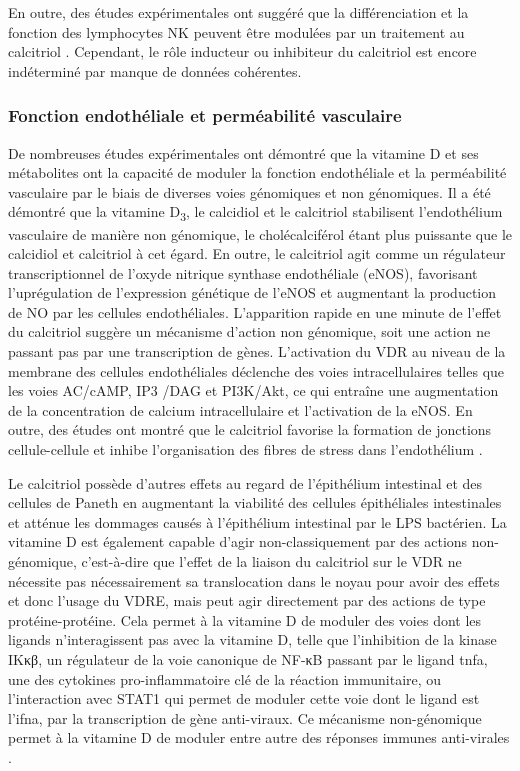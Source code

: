 \documentclass[
  a4paper,
  DIV=11,
  numbers=noendperiod,
  listof=totoc]{scrreprt}
\begin{document}
En outre, des études expérimentales ont suggéré que la différenciation
et la fonction des lymphocytes \ac{NK} peuvent être modulées par un
traitement au calcitriol \autocite{Charoenngam.2020}. Cependant, le rôle
inducteur ou inhibiteur du calcitriol est encore indéterminé par manque
de données cohérentes.

\hypertarget{fonction-endothuxe9liale-et-permuxe9abilituxe9-vasculaire}{%
\subsubsection{Fonction endothéliale et perméabilité
vasculaire}\label{fonction-endothuxe9liale-et-permuxe9abilituxe9-vasculaire}}

De nombreuses études expérimentales ont démontré que la vitamine D et
ses métabolites ont la capacité de moduler la fonction endothéliale et
la perméabilité vasculaire par le biais de diverses voies génomiques et
non génomiques. Il a été démontré que la vitamine D\textsubscript{3}, le
calcidiol et le calcitriol stabilisent l'endothélium vasculaire de
manière non génomique, le cholécalciférol étant plus puissante que le
calcidiol et calcitriol à cet égard. En outre, le calcitriol agit comme
un régulateur transcriptionnel de l'oxyde nitrique synthase endothéliale
(\acs{eNOS}), favorisant l'uprégulation de l'expression
génétique de l'\ac{eNOS} et augmentant la production de \ac{NO} par les
cellules endothéliales. L'apparition rapide en une minute de l'effet du
calcitriol suggère un mécanisme d'action non génomique, soit une action
ne passant pas par une transcription de gènes. L'activation du \ac{VDR}
au niveau de la membrane des cellules endothéliales déclenche des voies
intracellulaires telles que les voies AC/cAMP, IP3 /DAG et PI3K/Akt, ce
qui entraîne une augmentation de la concentration de calcium
intracellulaire et l'activation de la \ac{eNOS}. En outre, des études
ont montré que le calcitriol favorise la formation de jonctions
cellule-cellule et inhibe l'organisation des fibres de stress dans
l'endothélium \autocite{Charoenngam.2020}.

Le calcitriol possède d'autres effets au regard de l'épithélium
intestinal et des cellules de Paneth en augmentant la viabilité des
cellules épithéliales intestinales et atténue les dommages causés à
l'épithélium intestinal par le \ac{LPS} bactérien. La vitamine D est
également capable d'agir non-classiquement par des actions
non-génomique, c'est-à-dire que l'effet de la liaison du calcitriol sur
le VDR ne nécessite pas nécessairement sa translocation dans le noyau
pour avoir des effets et donc l'usage du \ac{VDRE}, mais peut agir
directement par des actions de type protéine-protéine. Cela permet à la
vitamine D de moduler des voies dont les ligands n'interagissent pas
avec la vitamine D, telle que l'inhibition de la kinase \ac{IKκβ}, un
régulateur de la voie canonique de \ac{NF-κB} passant par le ligand
\ac{tnfa}, une des cytokines pro-inflammatoire clé de la réaction
immunitaire, ou l'interaction avec STAT1 qui permet de moduler cette
voie dont le ligand est l'\ac{ifna}, par la transcription de gène
anti-viraux. Ce mécanisme non-génomique permet à la vitamine D de
moduler entre autre des réponses immunes anti-virales
\autocite{Hii.2016}.
\end{document}

